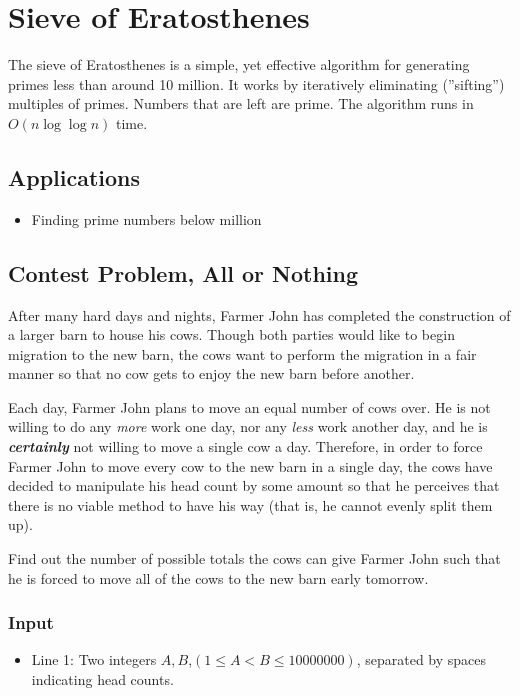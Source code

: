 \section{Sieve of Eratosthenes}
The sieve of Eratosthenes is a simple, yet effective algorithm for generating primes less than around 10 million.
It works by iteratively eliminating (''sifting'') multiples of primes.
Numbers that are left are prime.
The algorithm runs in $O(n\log\log n)$ time.

\subsection{Applications}
\begin{itemize}
	\item	Finding prime numbers below  million
\end{itemize}

\subsection{Contest Problem, All or Nothing}
After many hard days and nights, Farmer John has completed the construction of a larger barn to house his cows.
Though both parties would like to begin migration to the new barn, the cows want to perform the migration in a fair manner so that no cow gets to enjoy the new barn before another.

Each day, Farmer John plans to move an equal number of cows over.
He is not willing to do any \textit{more} work one day, nor any \textit{less} work another day, and he is \textbf{\textit{certainly}} not willing to move a single cow a day.
Therefore, in order to force Farmer John to move every cow to the new barn in a single day, the cows have decided to manipulate his head count by some amount so that he perceives that there is no viable method to have his way (that is, he cannot evenly split them up).

Find out the number of possible totals the cows can give Farmer John such that he is forced to move all of the cows to the new barn early tomorrow.

\subsubsection{Input}
\begin{itemize}
	\item Line 1: Two integers $A,B$,$(1 \leq A < B \leq 10000000)$, separated by spaces indicating head counts.
\end{itemize}

